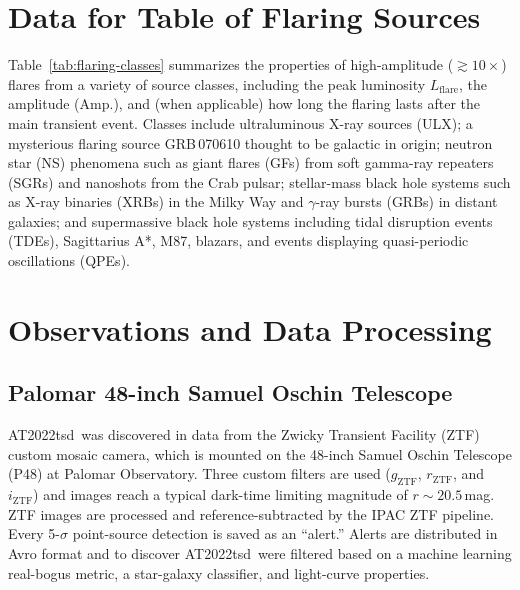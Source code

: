 \documentclass{nature_plusfigure}
\newcommand{\at}{AT2022tsd}
\begin{document}
\begin{methods}
\section{Data for Table of Flaring Sources}
\label{sec:data-table}

Table~\ref{tab:flaring-classes} summarizes the properties of high-amplitude ($\gtrsim 10\times$) flares from a variety of source classes,
including the peak luminosity $L_\mathrm{flare}$, the amplitude (Amp.), and (when applicable) how long the flaring lasts after the main transient event.
Classes include ultraluminous X-ray sources (ULX\cite{Mucciarelli2007}); a mysterious flaring source GRB\,070610 thought to be galactic in origin\cite{Kasliwal2008,Stefanescu2008,CastroTirado2008};
neutron star (NS) phenomena such as giant flares (GFs) from soft gamma-ray repeaters (SGRs\cite{Hurley1999}) and nanoshots from the Crab pulsar\cite{Hankins2003}; stellar-mass black hole systems such as X-ray binaries (XRBs\cite{Fender1997}) in the Milky Way and $\gamma$-ray bursts (GRBs\cite{Racusin2008}) in distant galaxies; and supermassive black hole systems including tidal disruption events (TDEs\cite{vanVelzen2021,Payne2022}), Sagittarius A*\cite{Marrone2008}, M87\cite{Abramowski2012}, blazars\cite{Nesci2021}, and events displaying quasi-periodic oscillations (QPEs\cite{Miniutti2023}).

\section{Observations and Data Processing}

\subsection{Palomar 48-inch Samuel Oschin Telescope}
\label{sec:p48}

\at\ was discovered in data from the Zwicky Transient Facility (ZTF\cite{Graham2019,Bellm2019}) custom mosaic camera\cite{Dekany2020}, which is mounted on the 48-inch Samuel Oschin Telescope (P48) at Palomar Observatory.
Three custom filters are used ($g_{\mathrm{ZTF}}$, $r_{\mathrm{ZTF}}$, and $i_{\mathrm{ZTF}}$\cite{Dekany2020})
and images reach a typical dark-time limiting magnitude of $r\sim20.5\,$mag.
ZTF images are processed and reference-subtracted\cite{Zackay2016}
by the IPAC ZTF pipeline\cite{Masci2019}.
Every 5-$\sigma$ point-source detection is saved as an ``alert.''
Alerts are distributed in Avro format\cite{Patterson2019} and to discover \at\ were filtered based on a machine learning real-bogus metric\cite{Duev2019}, a star-galaxy classifier\cite{Tachibana2018}, and light-curve properties.


\end{methods}
\end{document}
